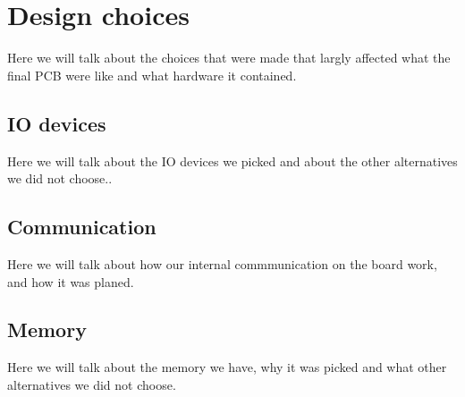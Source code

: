 \section {Design choices}

Here we will talk about the choices that were made that largly affected what the final PCB were like and what hardware it contained.

\subsection{IO devices} \label{pcb:design-choices:ss:IO_devices}

Here we will talk about the IO devices we picked and about the other alternatives we did not choose..

\subsection{Communication} \label{pcb:design-choices:ss:internal_communication}

Here we will talk about how our internal commmunication on the board work, and how it was planed.

\subsection{Memory} \label{pcb:design-choices:ss:memory}

Here we will talk about the memory we have, why it was picked and what other alternatives we did not choose.
